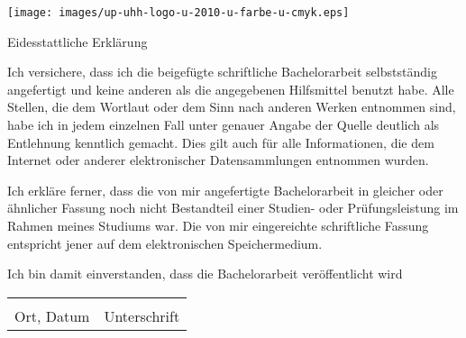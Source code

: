 \documentclass{scrreport}
\begin{document}
\texttt{[image: images/up-uhh-logo-u-2010-u-farbe-u-cmyk.eps]}\par
\vspace{4\baselineskip}

{\centering \huge Eidesstattliche Erklärung\par}

\vspace{1cm}

Ich versichere, dass ich die beigefügte schriftliche Bachelorarbeit selbstständig angefertigt und keine anderen als die angegebenen Hilfsmittel benutzt habe.
Alle Stellen, die dem Wortlaut oder dem Sinn nach anderen Werken entnommen sind, habe ich in jedem einzelnen Fall unter genauer Angabe der Quelle deutlich als Entlehnung kenntlich gemacht.
Dies gilt auch für alle Informationen, die dem Internet oder anderer elektronischer Datensammlungen entnommen wurden.

Ich erkläre ferner, dass die von mir angefertigte Bachelorarbeit in gleicher oder ähnlicher Fassung noch nicht Bestandteil einer Studien- oder Prüfungsleistung im Rahmen meines Studiums war.
Die von mir eingereichte schriftliche Fassung entspricht jener auf dem elektronischen Speichermedium.

Ich bin damit einverstanden, dass die Bachelorarbeit veröffentlicht wird

\vspace{2cm}

\begin{tabular}{@{}p{5cm}p{8cm}@{}}
    \hrulefill & \hrulefill \\
    Ort, Datum & Unterschrift \\
\end{tabular}
    
\end{document}
